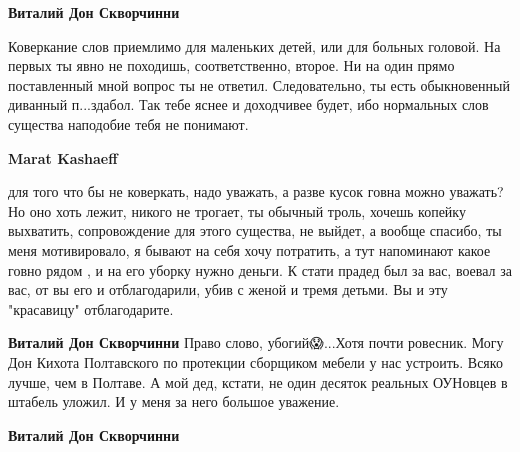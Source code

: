 \begin{itemize}
\begin{itemize}
 
\textbf{Виталий Дон Скворчинни} 

Коверкание слов приемлимо для маленьких детей, или для больных головой. На
первых ты явно не походишь, соответственно, второе. Ни на один прямо
поставленный мной вопрос ты не ответил. Следовательно, ты есть обыкновенный
диванный п...здабол. Так тебе яснее и доходчивее будет, ибо нормальных слов
существа наподобие тебя не понимают.


 
\textbf{Marat Kashaeff} 

для того что бы не коверкать, надо уважать, а разве кусок говна можно уважать?
Но оно хоть лежит, никого не трогает, ты обычный троль, хочешь копейку
выхватить, сопровождение для этого существа, не выйдет, а вообще спасибо, ты
меня мотивировало, я бывают на себя хочу потратить, а тут напоминают какое
говно рядом , и на его уборку нужно деньги. К стати прадед был за вас, воевал
за вас, от вы его и отблагодарили, убив с женой и тремя детьми. Вы и эту
"красавицу" отблагодарите.

 
\textbf{Виталий Дон Скворчинни} Право слово, убогий😱...Хотя почти ровесник. Могу Дон Кихота Полтавского по протекции сборщиком мебели у нас устроить. Всяко лучше, чем в Полтаве. А мой дед, кстати, не один десяток реальных ОУНовцев в штабель уложил. И у меня за него большое уважение.

 
\textbf{Виталий Дон Скворчинни} 


\end{itemize}
\end{itemize}
